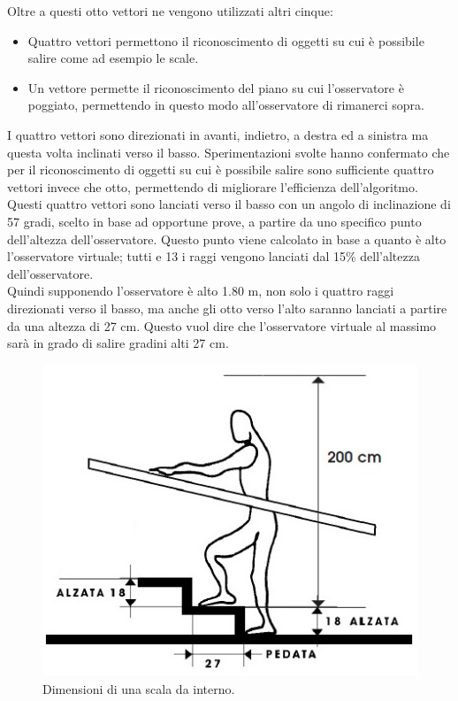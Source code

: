 Oltre a questi otto vettori ne vengono utilizzati altri cinque:
\begin{itemize}
\item Quattro vettori permettono il riconoscimento di oggetti su cui è possibile salire come ad esempio le scale.
\item Un vettore permette il riconoscimento del piano su cui l’osservatore è poggiato, permettendo in questo modo all’osservatore di rimanerci sopra.
\end{itemize}
I quattro vettori sono direzionati in avanti, indietro, a destra ed a sinistra ma questa volta inclinati verso il basso. Sperimentazioni svolte hanno confermato che per il riconoscimento di oggetti su cui è possibile salire sono sufficiente quattro vettori invece che otto, permettendo di migliorare l’efficienza dell’algoritmo.
\\
Questi quattro vettori sono lanciati verso il basso con un angolo di inclinazione di 57 gradi, scelto in base ad opportune prove, a partire da uno specifico punto dell’altezza dell’osservatore. Questo punto viene calcolato in base a quanto è alto l’osservatore virtuale; tutti e 13 i raggi vengono lanciati dal 15\% dell’altezza dell’osservatore.
\\
Quindi supponendo l’osservatore è alto 1.80 m, non solo i quattro raggi direzionati verso il basso, ma anche gli otto verso l’alto saranno lanciati a partire da una altezza di 27 cm.
Questo vuol dire che l’osservatore virtuale al massimo sarà in grado di salire gradini alti 27 cm.

\begin{figure}[htb]
 \centering
 \includegraphics[width=1\linewidth]{images/chapter_navigazione_scena/scala.jpg}\hfill
 \caption[Dimensioni di una scala da interno.]{Dimensioni di una scala da interno.}
 \label{fig:navigazione_scena_collision_scala}
\end{figure}

